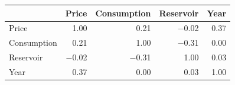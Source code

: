 \begin{tabular}{lrrrr}
\toprule
 & Price & Consumption & Reservoir & Year \\
\midrule
Price & 1.00 & 0.21 & \ensuremath{-}0.02 & 0.37 \\
Consumption & 0.21 & 1.00 & \ensuremath{-}0.31 & 0.00 \\
Reservoir & \ensuremath{-}0.02 & \ensuremath{-}0.31 & 1.00 & 0.03 \\
Year & 0.37 & 0.00 & 0.03 & 1.00 \\
\bottomrule
\end{tabular}
